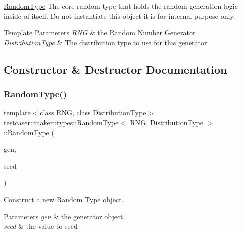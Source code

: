 \hyperlink{classtestcaser_1_1maker_1_1types_1_1RandomType}{Random\+Type} The core random type that holds the random generation logic inside of itself. Do not instantiate this object it is for internal purpose only. 


\begin{DoxyTemplParams}{Template Parameters}
{\em R\+NG} & the Random Number Generator \\
\hline
{\em Distribution\+Type} & The distribution type to use for this generator \\
\hline
\end{DoxyTemplParams}


\subsection{Constructor \& Destructor Documentation}
\mbox{\label{classtestcaser_1_1maker_1_1types_1_1RandomType_afbdc3b4fc75d54b90855ae3f5c9b2aff}} 
\subsubsection{\texorpdfstring{Random\+Type()}{RandomType()}}
{\footnotesize\ttfamily template$<$class R\+NG, class Distribution\+Type$>$ \\
\hyperlink{classtestcaser_1_1maker_1_1types_1_1RandomType}{testcaser\+::maker\+::types\+::\+Random\+Type}$<$ R\+NG, Distribution\+Type $>$\+::\hyperlink{classtestcaser_1_1maker_1_1types_1_1RandomType}{Random\+Type} (\begin{DoxyParamCaption}\item[{R\+NG \&}]{gen,  }\item[{typename R\+N\+G\+::result\+\_\+type}]{seed }\end{DoxyParamCaption})\hspace{0.3cm}{\ttfamily [inline]}}



Construct a new Random Type object. 


\begin{DoxyParams}{Parameters}
{\em gen} & the generator object. \\
\hline
{\em seed} & the value to seed \\
\hline
\end{DoxyParams}



